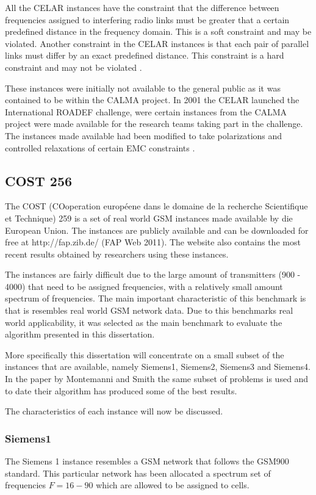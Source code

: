 All the CELAR instances have the constraint that the difference between frequencies assigned to interfering radio links must be greater that a certain predefined distance in the frequency domain. This is a soft constraint and may be violated. Another constraint in the CELAR instances is that each pair of parallel links must differ by an exact predefined distance. This constraint is a hard constraint and may not be violated \cite{DynamicFAP}.

These instances were initially not available to the general public as it was contained to be within the CALMA project. In 2001 the CELAR launched the International ROADEF challenge, were certain instances from the CALMA project were made available for the research teams taking part in the challenge. The instances made available had been modified to take polarizations and controlled relaxations of certain EMC constraints \cite{LowerPolarFAP}.
\subsection{COST 256}
\label{sec:COST259}
The COST (COoperation européene dans le domaine de la recherche Scientifique et Technique) 259 is a set of real world GSM instances made available by die European Union. The instances are publicly available and can  be downloaded for free at http://fap.zib.de/ (FAP Web 2011). The website also contains the most recent results obtained by researchers using these instances\cite{Karen2004,Eisenblatter}.

The instances are fairly difficult due to the large amount of transmitters (900 - 4000) that need to be assigned frequencies, with a relatively small amount spectrum of frequencies. The main important characteristic of this benchmark is that is resembles real world GSM network data. Due to this benchmarks real world applicability, it was selected as the main benchmark to evaluate the algorithm presented in this dissertation.

More specifically this dissertation will concentrate on a small subset of the instances that are available, namely Siemens1, Siemens2, Siemens3 and Siemens4. In the paper by Montemanni and Smith \cite{TabuMontemanniSmith} the same subset of problems is used and to date their algorithm has produced some of the best results. %

The characteristics of each instance will now be discussed.
\subsubsection{Siemens1}
The Siemens 1 instance resembles a GSM network that follows the GSM900 standard. This particular network has been allocated a spectrum set of frequencies $F = {16-90}$ which are allowed to be assigned to cells. 

